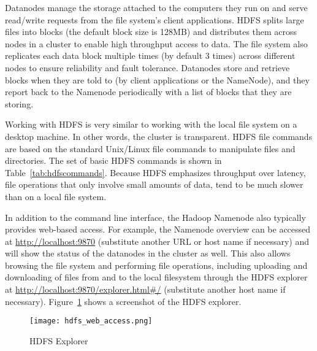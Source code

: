Datanodes manage the storage attached to the computers they run on and serve read/write requests from the file system's client applications. HDFS splits large files into blocks (the default block size is 128MB) and distributes them across nodes in a cluster to enable high throughput access to data. The file system also replicates each data block multiple times (by default 3 times) across different nodes to ensure reliability and fault tolerance. Datanodes store and retrieve blocks when they are told to (by client applications or the NameNode), and they report back to the Namenode periodically with a list of blocks that they are storing.

Working with HDFS is very similar to working with the local file system on a desktop machine. In other words, the cluster is transparent. HDFS file commands are based on the standard Unix/Linux file commands to manipulate files and directories. The set of basic HDFS commands is shown in Table~\ref{tab:hdfscommands}. Because HDFS emphasizes throughput over latency, file operations that only involve small amounts of data, tend to be much slower than on a local file system.

In addition to the command line interface, the Hadoop Namenode also typically provides web-based access. For example, the Namenode overview can be accessed at \url{http://localhost:9870} (substitute another URL or host name if necessary) and will show the status of the datanodes in the cluster as well. This also allows browsing the file system and performing file operations, including uploading and downloading of files from and to the local filesystem through the HDFS explorer at \url{http://localhost:9870/explorer.html#/} (substitute another host name if necessary). Figure~\ref{fig:hdfswebaccess} shows a screenshot of the HDFS explorer.

\begin{figure}
\centering
\texttt{[image: hdfs\_web\_access.png]}
\caption{HDFS Explorer}
\label{fig:hdfswebaccess}
\end{figure}

